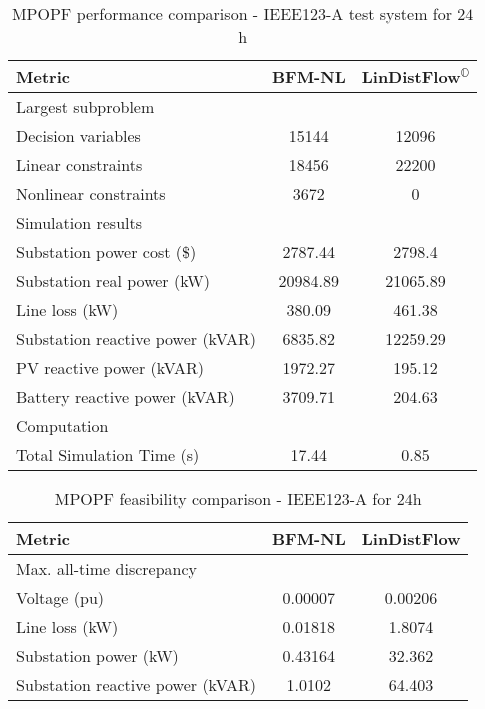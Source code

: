 \documentclass[../../outputs/main.tex]{subfiles}
\begin{document}
\begin{table}[t] %
    \centering
    \caption{MPOPF performance comparison - IEEE123-A test system for $24$h}
    \begin{tabular}{|l|c|c|}
    \hline
    \textbf{Metric} & \textbf{BFM-NL} & \textbf{LinDistFlow\textsuperscript{\(\mathbb{O}\)}} \\ \hline
    Largest subproblem & \multicolumn{2}{c|}{} \\ \hline
    \quad Decision variables & {15144} & {12096} \\ \hline
    \quad Linear constraints & {18456} & {22200} \\ \hline
    \quad Nonlinear constraints & {3672} & {0} \\ \hline
    Simulation results  & \multicolumn{2}{c|}{} \\ \hline
    \quad Substation power cost (\$) & 2787.44 & 2798.4 \\ \hline
    \quad Substation real power (kW) & 20984.89 & 21065.89 \\ \hline
    \quad Line loss (kW) & 380.09 & 461.38 \\ \hline
    \quad Substation reactive power (kVAR) & 6835.82 & 12259.29 \\ \hline
    \quad PV reactive power (kVAR) & 1972.27 & 195.12 \\ \hline
    \quad Battery reactive power (kVAR) & 3709.71 & 204.63 \\ \hline
    Computation  & \multicolumn{2}{c|}{} \\ \hline
    \quad Total Simulation Time (s) & 17.44 & 0.85 \\ \hline
    \end{tabular}
    \label{table:opt-5-20-30}
    \vspace{-3mm}
\end{table}

\begin{table}[t]
    \centering
    \caption{MPOPF feasibility comparison - IEEE123-A for $24$h}
    \begin{tabular}{|l|c|c|}
    \hline
    \textbf{Metric} & \textbf{BFM-NL} & \textbf{LinDistFlow} \\ \hline
    Max. all-time discrepancy & \multicolumn{2}{c|}{} \\ \hline
    \quad Voltage (pu) & 0.00007 & 0.00206 \\ \hline
    \quad Line loss (kW) & 0.01818 & 1.8074 \\ \hline
    \quad Substation power (kW) & 0.43164 & 32.362 \\ \hline
    \quad Substation reactive power (kVAR) & 1.0102 & 64.403 \\ \hline
    \end{tabular}
    \label{table:feas-copf-10-20-30}
    \vspace{-3mm}
\end{table}
\end{document}

